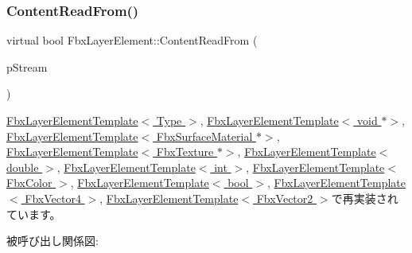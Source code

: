 \mbox{\label{class_fbx_layer_element_a407c679ef12336f2cf916f598053bf02}} 
\subsubsection{\texorpdfstring{Content\+Read\+From()}{ContentReadFrom()}}
{\footnotesize\ttfamily virtual bool Fbx\+Layer\+Element\+::\+Content\+Read\+From (\begin{DoxyParamCaption}\item[{const \hyperlink{class_fbx_stream}{Fbx\+Stream} \&}]{p\+Stream }\end{DoxyParamCaption})\hspace{0.3cm}{\ttfamily [virtual]}}



\hyperlink{class_fbx_layer_element_template_a19424f43272601bf018b8a0ba843b094}{Fbx\+Layer\+Element\+Template$<$ Type $>$}, \hyperlink{class_fbx_layer_element_template_a19424f43272601bf018b8a0ba843b094}{Fbx\+Layer\+Element\+Template$<$ void $\ast$$>$}, \hyperlink{class_fbx_layer_element_template_a19424f43272601bf018b8a0ba843b094}{Fbx\+Layer\+Element\+Template$<$ Fbx\+Surface\+Material $\ast$$>$}, \hyperlink{class_fbx_layer_element_template_a19424f43272601bf018b8a0ba843b094}{Fbx\+Layer\+Element\+Template$<$ Fbx\+Texture $\ast$$>$}, \hyperlink{class_fbx_layer_element_template_a19424f43272601bf018b8a0ba843b094}{Fbx\+Layer\+Element\+Template$<$ double $>$}, \hyperlink{class_fbx_layer_element_template_a19424f43272601bf018b8a0ba843b094}{Fbx\+Layer\+Element\+Template$<$ int $>$}, \hyperlink{class_fbx_layer_element_template_a19424f43272601bf018b8a0ba843b094}{Fbx\+Layer\+Element\+Template$<$ Fbx\+Color $>$}, \hyperlink{class_fbx_layer_element_template_a19424f43272601bf018b8a0ba843b094}{Fbx\+Layer\+Element\+Template$<$ bool $>$}, \hyperlink{class_fbx_layer_element_template_a19424f43272601bf018b8a0ba843b094}{Fbx\+Layer\+Element\+Template$<$ Fbx\+Vector4 $>$}, \hyperlink{class_fbx_layer_element_template_a19424f43272601bf018b8a0ba843b094}{Fbx\+Layer\+Element\+Template$<$ Fbx\+Vector2 $>$}で再実装されています。

被呼び出し関係図\+:
\mbox{\label{class_fbx_layer_element_aa60d2178a7601f0e78a472fa7fd774aa}} 
